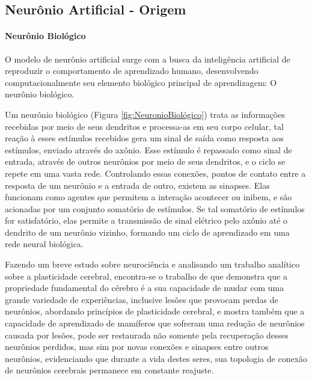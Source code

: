 \subsection{Neurônio Artificial - Origem}
          \paragraph*{Neurônio Biológico}
            O modelo de neurônio artificial surge com a busca da inteligência artificial de reproduzir o comportamento de aprendizado humano, desenvolvendo computacionalmente seu elemento biológico principal de aprendizagem: O neurônio biológico. 
            \begin{figure}[H]
            \end{figure}

Um neurônio biológico (Figura \ref{fig:NeuronioBiológico}) trata as informações recebidas por meio de seus dendritos e processa-as em seu corpo celular, tal reação à esses estímulos recebidos gera um sinal de saída como resposta aos estímulos, enviado através do axônio. Esse estímulo é repassado como sinal de entrada, através de outros neurônios por meio de seus dendritos, e o ciclo se repete em uma vasta rede.
Controlando essas conexões, pontos de contato entre a resposta de um neurônio e a entrada de outro, existem as sinapses. Elas funcionam como agentes que permitem a interação acontecer ou inibem, e são acionadas por um conjunto somatório de estímulos. Se tal somatório de estímulos for satisfatório, elas permite a transmissão de sinal elétrico pelo axônio até o dendrito de um neurônio vizinho, formando um ciclo de aprendizado em uma rede neural biológica.

Fazendo um breve estudo sobre neurociência e analisando um trabalho analítico sobre a plasticidade cerebral, encontra-se o trabalho de  que demonstra que a propriedade fundamental do cérebro é a sua capacidade de mudar com uma grande variedade de experiências, inclusive lesões que provocam perdas de neurônios, abordando princípios de plasticidade cerebral, e mostra também que a capacidade de aprendizado de mamíferos que sofreram uma redução de neurônios causada por lesões, pode ser restaurada não somente pela recuperação desses neurônios perdidos, mas sim por novas conexões e sinapses entre outros neurônios, evidenciando que durante a vida destes seres, sua topologia de conexão de neurônios cerebrais permanece em constante reajuste.

